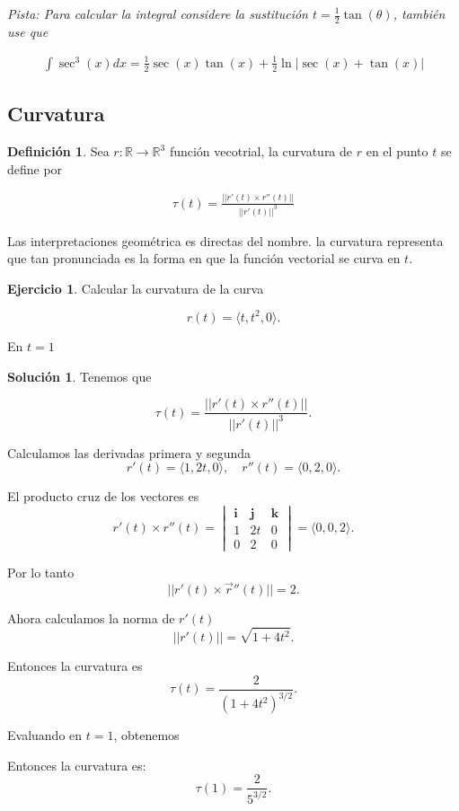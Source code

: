 \documentclass{article}
\theoremstyle{plain}
\theoremstyle{definition}
\newtheorem{defin}[thm]{Definición}
\newtheorem{ejer}[thm]{Ejercicio}
\newtheorem{sol}[thm]{Solución}
\begin{document}
\textit{Pista: Para calcular la integral considere la sustituci\'on $t=\frac{1}{2}\tan(\theta)$, tambi\'en use que}

\begin{align*}
    \int \sec^3(x)dx = \frac{1}{2}\sec(x)\tan(x)+\frac{1}{2}\ln|\sec(x)+\tan(x)|
\end{align*}

\newpage

\subsection{Curvatura}


\begin{defin}Sea $r: \mathbb{R} \to \mathbb{R}^3$ función vecotrial, la curvatura de $r$ en el punto $t$ se define por
\end{defin}

\begin{align*}
    \tau(t) = \frac{||r'(t) \times r''(t)||}{|| r'(t)||^3}
\end{align*}






Las interpretaciones geométrica es directas del nombre. la curvatura representa que tan pronunciada es la forma en que la funci\'on vectorial se curva en $t$. \\

\begin{ejer}Calcular la curvatura de la curva
\end{ejer}

\[
r(t) = \langle t, t^2, 0 \rangle.
\]

En $t=1$ \\

\begin{sol}Tenemos que
\end{sol}

\[
\tau(t) = \frac{||r'(t) \times r''(t)||}{||r'(t)||^3}.
\]

Calculamos las derivadas primera y segunda
\[
r'(t) = \langle 1, 2t, 0 \rangle, \quad r''(t) = \langle 0, 2, 0 \rangle.
\]

El producto cruz de los vectores es
\[
r'(t) \times r''(t) =
\begin{vmatrix}
\mathbf{i} & \mathbf{j} & \mathbf{k} \\
1 & 2t & 0 \\
0 & 2 & 0
\end{vmatrix}
= \langle 0, 0, 2 \rangle.
\]

Por lo tanto
\[
||r'(t) \times \vec{r}''(t)|| = 2.
\]

Ahora calculamos la norma de \( r'(t) \)
\[
||r'(t)|| = \sqrt{1 + 4t^2}.
\]

Entonces la curvatura es
\[
\tau(t) = \frac{2}{(1 + 4t^2)^{3/2}}.
\]

Evaluando en $t=1$, obtenemos

Entonces la curvatura es:
\[
\tau(1) = \frac{2}{5^{3/2}}.
\]
\end{document}
